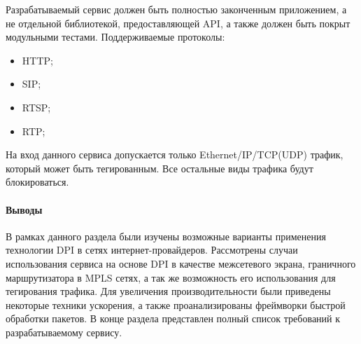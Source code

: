 Разрабатываемый сервис должен быть полностью законченным приложением, а не отдельной библиотекой, предоставляющей API, а также должен быть покрыт модульными тестами. Поддерживаемые протоколы:
\begin{itemize}
\item HTTP;
\item SIP;
\item RTSP;
\item RTP;
\end{itemize}

На вход данного сервиса допускается только Ethernet/IP/TCP(UDP) трафик, который может быть тегированным. Все остальные виды трафика будут блокироваться.

\paragraph{Выводы}

В рамках данного раздела были изучены возможные варианты применения технологии DPI в сетях интернет-провайдеров. Рассмотрены случаи использования сервиса на основе DPI в качестве межсетевого экрана, граничного маршрутизатора в MPLS сетях, а так же возможность его использования для тегирования трафика. Для увеличения производительности были приведены некоторые техники ускорения, а также проанализированы фреймворки быстрой обработки пакетов. В конце раздела представлен полный список требований к разрабатываемому сервису.
